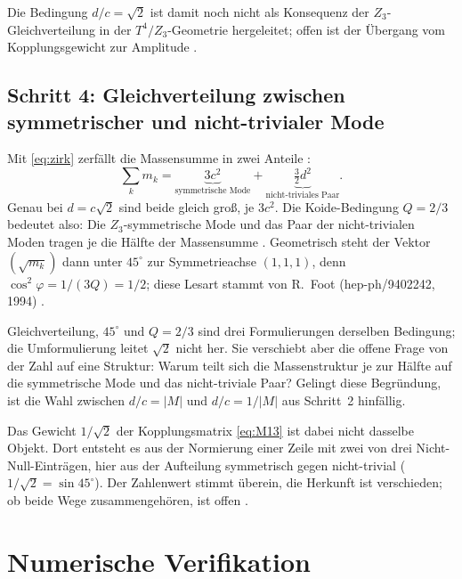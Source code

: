 Die Bedingung $d/c = \sqrt{2}$ ist damit noch nicht als Konsequenz der
$Z_3$-Gleichverteilung in der $T^4/Z_3$-Geometrie hergeleitet; offen ist
der Übergang vom Kopplungsgewicht zur Amplitude \SM.

\subsection*{Schritt 4: Gleichverteilung zwischen symmetrischer und nicht-trivialer Mode}

Mit \eqref{eq:zirk} zerfällt die Massensumme in zwei Anteile \BM:
\begin{equation}
  \sum_k m_k = \underbrace{3c^2}_{\text{symmetrische Mode}}
  + \underbrace{\tfrac{3}{2}d^2}_{\text{nicht-triviales Paar}} .
  \label{eq:gleichvert}
\end{equation}
Genau bei $d = c\sqrt{2}$ sind beide gleich groß, je $3c^2$. Die Koide-Bedingung
$Q = 2/3$ bedeutet also: Die $Z_3$-symmetrische Mode und das Paar der
nicht-trivialen Moden tragen je die Hälfte der Massensumme \BM. Geometrisch steht
der Vektor $(\sqrt{m_k})$ dann unter $45^\circ$ zur Symmetrieachse $(1,1,1)$, denn
$\cos^2\varphi = 1/(3Q) = 1/2$; diese Lesart stammt von R.~Foot
(hep-ph/9402242, 1994) \QM.

Gleichverteilung, $45^\circ$ und $Q = 2/3$ sind drei Formulierungen derselben
Bedingung; die Umformulierung leitet $\sqrt{2}$ nicht her. Sie verschiebt aber die
offene Frage von der Zahl auf eine Struktur: Warum teilt sich die Massenstruktur
je zur Hälfte auf die symmetrische Mode und das nicht-triviale Paar? Gelingt diese
Begründung, ist die Wahl zwischen $d/c = |M|$ und $d/c = 1/|M|$ aus Schritt~2
hinfällig.

Das Gewicht $1/\sqrt{2}$ der Kopplungsmatrix \eqref{eq:M13} ist dabei nicht
dasselbe Objekt. Dort entsteht es aus der Normierung einer Zeile mit zwei von drei
Nicht-Null-Einträgen, hier aus der Aufteilung symmetrisch gegen nicht-trivial
($1/\sqrt{2} = \sin 45^\circ$). Der Zahlenwert stimmt überein, die Herkunft ist
verschieden; ob beide Wege zusammengehören, ist offen \SM.

\section{Numerische Verifikation}


